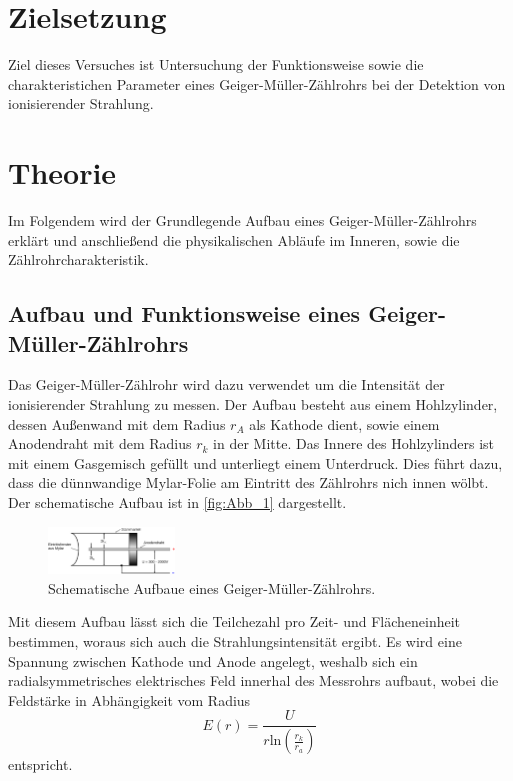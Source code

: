 \section{Zielsetzung}
\label{sec:Zielsetzung}
Ziel dieses Versuches ist Untersuchung der Funktionsweise sowie die charakteristichen
Parameter eines Geiger-Müller-Zählrohrs bei der Detektion von ionisierender Strahlung.

\section{Theorie}
\label{sec:Theorie}
Im Folgendem wird der Grundlegende Aufbau eines Geiger-Müller-Zählrohrs erklärt und 
anschließend die physikalischen Abläufe im Inneren, sowie die Zählrohrcharakteristik.

\subsection{Aufbau und Funktionsweise eines Geiger-Müller-Zählrohrs}
\label{subsec:AufuFunk}
Das Geiger-Müller-Zählrohr wird dazu verwendet um die Intensität der ionisierender Strahlung
zu messen. Der Aufbau besteht aus einem Hohlzylinder, dessen Außenwand mit dem Radius $r_A$ als Kathode
dient, sowie einem Anodendraht mit dem Radius $r_k$ in der Mitte. Das Innere des Hohlzylinders
ist mit einem Gasgemisch gefüllt und unterliegt einem Unterdruck. Dies führt dazu, dass die dünnwandige
Mylar-Folie am Eintritt des Zählrohrs nich innen wölbt. Der schematische Aufbau ist in \autoref{fig:Abb_1}
dargestellt.
\begin{figure}[H]
    \centering
    \includegraphics[width=0.3\textwidth]{Abbildungen/Abb_1.png}
    \caption{Schematische Aufbaue eines Geiger-Müller-Zählrohrs.\cite{V703}}
    \label{fig:Abb_1}
\end{figure}
Mit diesem Aufbau lässt sich die Teilchezahl pro Zeit- und Flächeneinheit bestimmen,
woraus sich auch die Strahlungsintensität ergibt. Es wird eine Spannung zwischen 
Kathode und Anode angelegt, weshalb sich ein radialsymmetrisches elektrisches Feld
innerhal des Messrohrs aufbaut, wobei die Feldstärke in Abhängigkeit vom Radius
\begin{equation*}
    E(r) = \frac{U}{r\text{ln}(\frac{r_k}{r_a})}
\end{equation*}
entspricht.
